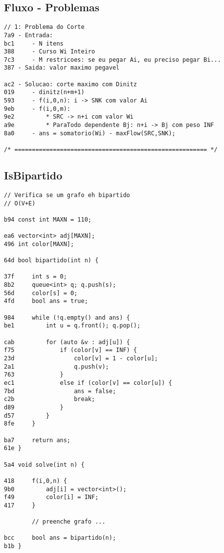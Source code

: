 \documentclass[11pt, a4paper, twoside]{article}
\begin{document}
\subsection{Fluxo - Problemas}
\begin{lstlisting}
// 1: Problema do Corte
7a9 - Entrada:
bc1 	- N itens
388 	- Curso Wi Inteiro
7c3 	- M restricoes: se eu pegar Ai, eu preciso pegar Bi...
387 - Saida: valor maximo pegavel

ac2 - Solucao: corte maximo com Dinitz
019 	- dinitz(n+m+1)
593 	- f(i,0,n): i -> SNK com valor Ai
9eb 	- f(i,0,m):
9e2 		* SRC -> n+i com valor Wi
a9e 		* ParaTodo dependente Bj: n+i -> Bj com peso INF
8a0 	- ans = somatorio(Wi) - maxFlow(SRC,SNK);

/* ======================================================= */
\end{lstlisting}

\subsection{IsBipartido}
\begin{lstlisting}
// Verifica se um grafo eh bipartido
// O(V+E)

b94 const int MAXN = 110;

ea6 vector<int> adj[MAXN];
496 int color[MAXN];

64d bool bipartido(int n) {
    
37f     int s = 0;
8b2     queue<int> q; q.push(s);
56d     color[s] = 0;
4fd     bool ans = true; 
    
984     while (!q.empty() and ans) { 
be1         int u = q.front(); q.pop();
    
cab         for (auto &v : adj[u]) {
f75             if (color[v] == INF) {                            
23d                 color[v] = 1 - color[u]; 
2a1                 q.push(v);
763             }
ec1             else if (color[v] == color[u]) {                        
7bd                 ans = false; 
c2b                 break;               
d89             }
d57         }
8fe     }
    
ba7     return ans;
61e }

5a4 void solve(int n) {
    
418 	f(i,0,n) {
9b0 		adj[i] = vector<int>();
f49 		color[i] = INF;
417 	}
    
    	// preenche grafo ...
    
bcc 	bool ans = bipartido(n);
b1b }
\end{lstlisting}
\end{document}
